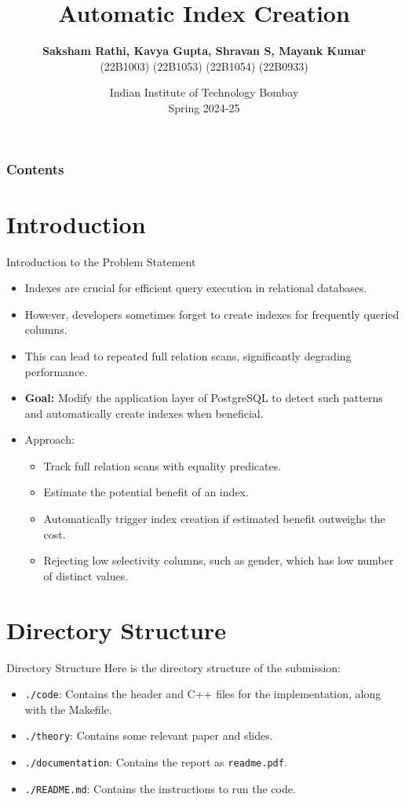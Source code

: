 \documentclass[Serif, 10pt, brown]{beamer}
\title[{CS349 Project}]{\sc Automatic Index Creation}
\author[\ul{Authors}]{{\bf { Saksham Rathi, Kavya Gupta, Shravan S, Mayank Kumar}}\\ {\footnotesize \hspace{0cm} (22B1003) \hspace{1cm} (22B1053) \hspace{0.5cm} (22B1054) \hspace{0.5cm} (22B0933)}}
\institute[UTD]{\sc\small CS349: DataBase and Information Systems\\ Under Prof. Sudarshan and Prof. Suraj}
\date[UCI]{Indian Institute of Technology Bombay \\ Spring 2024-25}
\theoremstyle{example}
\theoremstyle{plain}
\begin{document}
\frame{\titlepage}
%
%


\begin{frame}
	\transblindsvertical
	\frametitle{Contents}
	\tableofcontents[hidesubsections]
\end{frame}

\section{Introduction}
\begin{frame}{Introduction to the Problem Statement}

	\begin{itemize}
		\item Indexes are crucial for efficient query execution in relational databases.
		\item However, developers sometimes forget to create indexes for frequently queried columns.
		\item This can lead to repeated full relation scans, significantly degrading performance.
		\item {\bf Goal:} Modify the application layer of PostgreSQL to detect such patterns and automatically create indexes when beneficial.
		\item Approach:
		\begin{itemize}
			\item Track full relation scans with equality predicates.
			\item Estimate the potential benefit of an index.
			\item Automatically trigger index creation if estimated benefit outweighs the cost.
			\item Rejecting low selectivity columns, such as gender, which has low number of distinct values.
		\end{itemize}
	\end{itemize}
\end{frame}

\section{Directory Structure}
\begin{frame}{Directory Structure}
	Here is the directory structure of the submission:
	\begin{itemize}
		\item \texttt{./code}: Contains the header and C++ files for the implementation, along with the Makefile.
		\item \texttt{./theory}: Contains some relevant paper and slides.
		\item \texttt{./documentation}: Contains the report as \texttt{readme.pdf}.
		\item \texttt{./README.md}: Contains the instructions to run the code.
	\end{itemize}
\end{frame}
\end{document}
